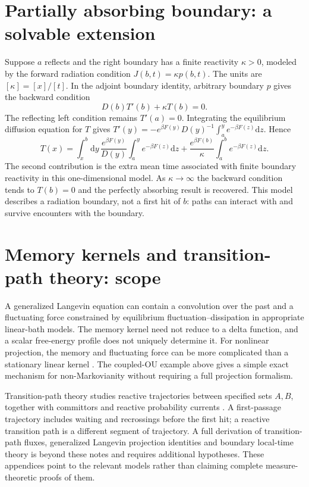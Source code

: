 \documentclass[11pt,a4paper]{article}
\newcommand{\dd}{\mathrm d}
\theoremstyle{remark}\newtheorem*{remark}{Physical interpretation}
\begin{document}
\section{Partially absorbing boundary: a solvable extension}
Suppose $a$ reflects and the right boundary has a finite reactivity $\kappa>0$, modeled by the forward radiation condition $J(b,t)=\kappa p(b,t)$. The units are $[\kappa]=[x]/[t]$. In the adjoint boundary identity, arbitrary boundary $p$ gives the backward condition
\begin{equation}
D(b)T'(b)+\kappa T(b)=0.
\end{equation}
The reflecting left condition remains $T'(a)=0$. Integrating the equilibrium diffusion equation for $T$ gives $T'(y)=-e^{\beta F(y)}D(y)^{-1}\int_a^y e^{-\beta F(z)}\dd z$. Hence
\begin{equation}
T(x)=\int_x^b\dd y\,\frac{e^{\beta F(y)}}{D(y)}\int_a^y e^{-\beta F(z)}\dd z
+\frac{e^{\beta F(b)}}{\kappa}\int_a^b e^{-\beta F(z)}\dd z.
\end{equation}
The second contribution is the extra mean time associated with finite boundary reactivity in this one-dimensional model. As $\kappa\to\infty$ the backward condition tends to $T(b)=0$ and the perfectly absorbing result is recovered. This model describes a radiation boundary, not a first hit of $b$: paths can interact with and survive encounters with the boundary.

\section{Memory kernels and transition-path theory: scope}
A generalized Langevin equation can contain a convolution over the past and a fluctuating force constrained by equilibrium fluctuation--dissipation in appropriate linear-bath models. The memory kernel need not reduce to a delta function, and a scalar free-energy profile does not uniquely determine it. For nonlinear projection, the memory and fluctuating force can be more complicated than a stationary linear kernel \cite{ayaz}. The coupled-OU example above gives a simple exact mechanism for non-Markovianity without requiring a full projection formalism.

Transition-path theory studies reactive trajectories between specified sets $A,B$, together with committors and reactive probability currents \cite{evanden}. A first-passage trajectory includes waiting and recrossings before the first hit; a reactive transition path is a different segment of trajectory. A full derivation of transition-path fluxes, generalized Langevin projection identities and boundary local-time theory is beyond these notes and requires additional hypotheses. These appendices point to the relevant models rather than claiming complete measure-theoretic proofs of them.
\end{document}

